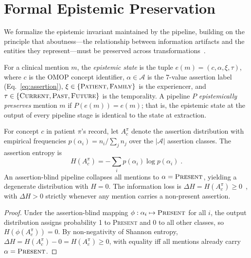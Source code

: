 \section{Formal Epistemic Preservation}
\label{app:formal}

We formalize the epistemic invariant maintained by the \epikg pipeline, building on the principle that aboutness---the relationship between information artifacts and the entities they represent---must be preserved across transformations~\cite{ceusters2015ontologyepistemology}.

\begin{definition}
\label{def:epistemic}
For a clinical mention $m$, the \emph{epistemic state} is the tuple $e(m) = (c, \alpha, \xi, \tau)$, where $c$ is the OMOP concept identifier, $\alpha \in \mathcal{A}$ is the 7-value assertion label (Eq.~\ref{eq:assertion}), $\xi \in \{\textnormal{\textsc{Patient}}, \textnormal{\textsc{Family}}\}$ is the experiencer, and $\tau \in \{\textnormal{\textsc{Current}}, \textnormal{\textsc{Past}}, \textnormal{\textsc{Future}}\}$ is the temporality.
A pipeline $P$ \emph{epistemically preserves} mention $m$ if $P(e(m)) = e(m)$; that is, the epistemic state at the output of every pipeline stage is identical to the state at extraction.
\end{definition}

\begin{proposition}
\label{prop:entropy}
For concept $c$ in patient $\pi$'s record, let $A_c^\pi$ denote the assertion distribution with empirical frequencies $p(\alpha_i) = n_i / \sum_j n_j$ over the $|\mathcal{A}|$ assertion classes.
The assertion entropy is
\begin{equation}
\label{eq:entropy}
H(A_c^\pi) = -\sum_{i} p(\alpha_i) \log p(\alpha_i) \;.
\end{equation}
An assertion-blind pipeline collapses all mentions to $\alpha = \textsc{Present}$, yielding a degenerate distribution with $H = 0$.
The information loss is $\Delta H = H(A_c^\pi) \geq 0$~\cite{shannon1948}, with $\Delta H > 0$ strictly whenever any mention carries a non-present assertion.
\end{proposition}

\begin{proof}
Under the assertion-blind mapping $\phi: \alpha_i \mapsto \textsc{Present}$ for all $i$, the output distribution assigns probability 1 to \textsc{Present} and 0 to all other classes, so $H(\phi(A_c^\pi)) = 0$.
By non-negativity of Shannon entropy, $\Delta H = H(A_c^\pi) - 0 = H(A_c^\pi) \geq 0$, with equality iff all mentions already carry $\alpha = \textsc{Present}$.
\end{proof}

